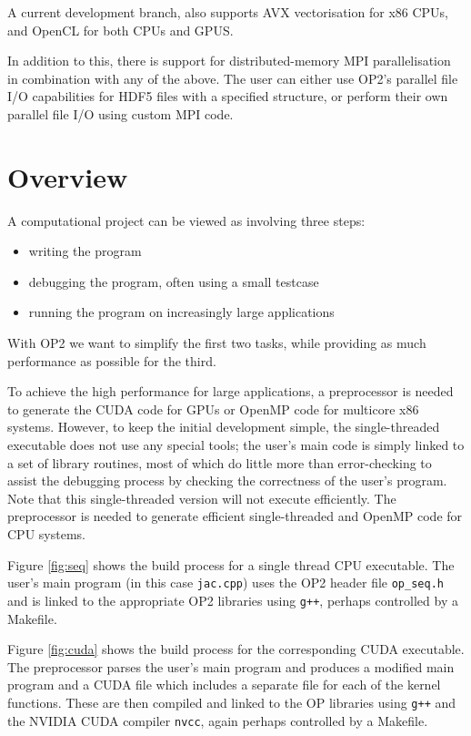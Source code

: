 \documentclass[11pt]{article}
\begin{document}
\noindent A current development branch, also supports AVX vectorisation for x86 CPUs, and OpenCL for both CPUs and GPUS.

In addition to this, there is support for distributed-memory MPI
parallelisation in combination with any of the above.  The user
can either use OP2's parallel file I/O capabilities for HDF5
files with a specified structure, or perform their own parallel
file I/O using custom MPI code.

\newpage
\section{Overview}

A computational project can be viewed as involving three steps:
\begin{itemize}
\item
writing the program
\item
debugging the program, often using a small testcase
\item
running the program on increasingly large applications
\end{itemize}

\noindent With OP2 we want to simplify the first two tasks, while
providing as much performance as possible for the third.

To achieve the high performance for large applications, a
preprocessor is needed to generate the CUDA code for GPUs
or OpenMP code for multicore x86 systems.  However, to keep
the initial development simple, the single-threaded executable
does not use any special tools; the user's main code is simply
linked to a set of library routines, most of which do little
more than error-checking to assist the debugging process by
checking the correctness of the user's program.  Note that this
single-threaded version will not execute efficiently.  The
preprocessor is needed to generate efficient single-threaded and OpenMP code for
CPU systems.

Figure \ref{fig:seq} shows the build process for a single
thread CPU executable.  The user's main program (in this case
{\tt jac.cpp}) uses the OP2 header file {\tt op\_seq.h} and is
linked to the appropriate OP2 libraries using {\tt g++},
perhaps controlled by a Makefile.

Figure \ref{fig:cuda} shows the build process for the corresponding
CUDA executable.  The preprocessor parses the user's main program
and produces a modified main program and a CUDA file which
includes a separate file for each of the kernel functions.  These
are then compiled and linked to the OP libraries
using {\tt g++} and the NVIDIA CUDA compiler {\tt nvcc}, again
perhaps controlled by a Makefile.
\end{document}
